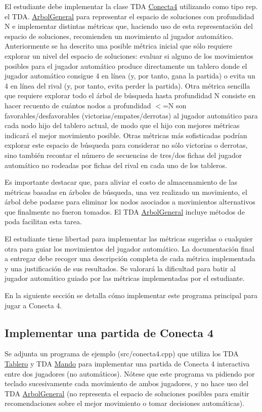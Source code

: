 El estudiante debe implementar la clase T\+DA \hyperlink{classConecta4}{Conecta4} utilizando como tipo rep. el T\+DA. \hyperlink{classArbolGeneral}{Arbol\+General} para representar el espacio de soluciones con profundidad N e implementar distintas métricas que, haciendo uso de esta representación del espacio de soluciones, recomienden un movimiento al jugador automático. Anteriormente se ha descrito una posible métrica inicial que sólo requiere explorar un nivel del espacio de soluciones\+: evaluar si alguno de los movimientos posibles para el jugador automático produce directamente un tablero donde el jugador automático consigue 4 en línea (y, por tanto, gana la partida) o evita un 4 en línea del rival (y, por tanto, evita perder la partida). Otra métrica sencilla que requiere explorar todo el árbol de búsqueda hasta profundidad N consiste en hacer recuento de cuántos nodos a profundidad $<$=N son favorables/desfavorables (victorias/empates/derrotas) al jugador automático para cada nodo hijo del tablero actual, de modo que el hijo con mejores métricas indicará el mejor movimiento posible. Otras métricas más sofisticadas podrían explorar este espacio de búsqueda para considerar no sólo victorias o derrotas, sino también recontar el número de secuencias de tres/dos fichas del jugador automático no rodeadas por fichas del rival en cada uno de los tableros.

Es importante destacar que, para aliviar el costo de almacenamiento de las métricas basadas en árboles de búsqueda, una vez realizado un movimiento, el árbol debe podarse para eliminar los nodos asociados a movimientos alternativos que finalmente no fueron tomados. El T\+DA \hyperlink{classArbolGeneral}{Arbol\+General} incluye métodos de poda facilitan esta tarea.

El estudiante tiene libertad para implementar las métricas sugeridas o cualquier otra para guiar los movimientos del jugador automático. La documentación final a entregar debe recoger una descripción completa de cada métrica implementada y una justificación de sus resultados. Se valorará la dificultad para batir al jugador automático guiado por las métricas implementadas por el estudiante.

En la siguiente sección se detalla cómo implementar este programa principal para jugar a Conecta 4.\hypertarget{index_partida}{}\subsection{Implementar una partida de Conecta 4}\label{index_partida}
Se adjunta un programa de ejemplo ({\ttfamily src/conecta4.\+cpp}) que utiliza los T\+DA \hyperlink{classTablero}{Tablero} y T\+DA \hyperlink{classMando}{Mando} para implementar una partida de Conecta 4 interactiva entre dos jugadores (no automáticos). Nótese que este programa va pidiendo por teclado sucesivamente cada movimiento de ambos jugadores, y no hace uso del T\+DA \hyperlink{classArbolGeneral}{Arbol\+General} (no representa el espacio de soluciones posibles para emitir recomendaciones sobre el mejor movimiento o tomar decisiones automáticas).



